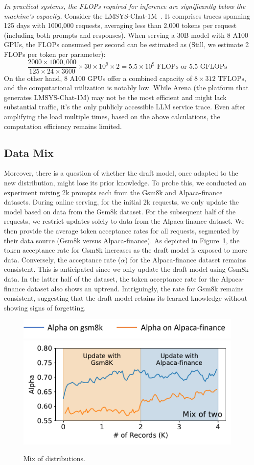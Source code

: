 \emph{In practical systems, the FLOPs required for inference are significantly below the machine's capacity.} 
Consider the LMSYS-Chat-1M~\cite{zheng2023lmsyschat1m}. It comprises traces spanning 125 days with 1000,000 requests, averaging less than 2,000 tokens per request (including both prompts and responses).
When serving a 30B model with 8 A100 GPUs, the FLOPs consumed per second can be estimated as (Still, we estimate 2 FLOPs per token per parameter):
\[ \frac{2000 \times 1000,000}{125 \times 24 \times 3600} \times 30 \times 10^9 \times 2 = 5.5 \times 10^9 \text{ FLOPs or 5.5 GFLOPs} \]
On the other hand, 8 A100 GPUs offer a combined capacity of \( 8 \times 312 \text{ TFLOPs} \), and the computational utilization is notably low. 
While Arena (the platform that generates LMSYS-Chat-1M) may not be the most efficient and might lack substantial traffic, it's the only publicly accessible LLM service trace. 
Even after amplifying the load multiple times, based on the above calculations, the computation efficiency remains limited.


\subsection{Data Mix}
\label{appendix:data-mix}
Moreover, there is a question of whether the draft model, once adapted to the new distribution, might lose its prior knowledge. 
To probe this, we conducted an experiment mixing 2k prompts each from the Gsm8k and Alpaca-finance datasets. 
During online serving, for the initial 2k requests, we only update the model based on data from the Gsm8k dataset. 
For the subsequent half of the requests, we restrict updates solely to data from the Alpaca-finance dataset. 
We then provide the average token acceptance rates for all requests, segmented by their data source (Gsm8k versus Alpaca-finance).
As depicted in Figure~\ref{fig:mix}, the token acceptance rate for Gsm8k increases as the draft model 
is exposed to more data. Conversely, the acceptance rate (\(\alpha\)) for the Alpaca-finance dataset remains consistent. 
This is anticipated since we only update the draft model using Gsm8k data. In the latter half of the dataset, 
the token acceptance rate for the Alpaca-finance dataset also shows an uptrend. Intriguingly, the rate for Gsm8k remains consistent, 
suggesting that the draft model retains its learned knowledge without showing signs of forgetting.

\begin{figure}      
    \centering
    \includegraphics[width=0.48\linewidth]{figures/appendix_legend.pdf} \\
    \includegraphics[width=0.48\linewidth]{figures/mix.pdf}
    \caption{Mix of distributions.}
    \label{fig:mix}
\end{figure}

